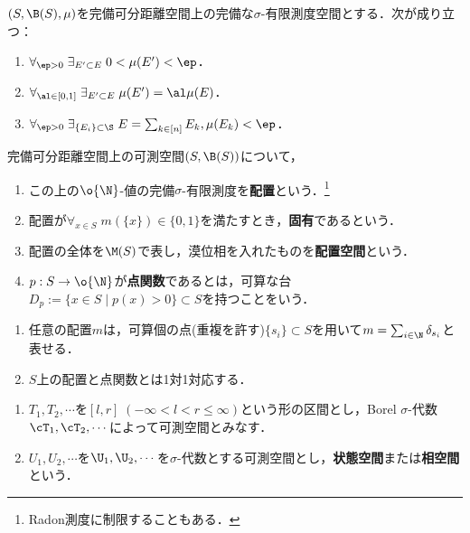 \documentclass[uplatex,dvipdfmx]{jsreport}
\begin{document}
\begin{lemma}
    $(S,\B(S),\mu)$を完備可分距離空間上の完備な$\sigma$-有限測度空間とする．次が成り立つ：
    \begin{enumerate}
        \item $\forall_{\ep>0}\;\exists_{E'\subset E}\;0<\mu(E')<\ep$．
        \item $\forall_{\al\in[0,1]}\;\exists_{E'\subset E}\;\mu(E')=\al\mu(E)$．
        \item $\forall_{\ep>0}\;\exists_{\{E_i\}\subset\S}\;E=\sum_{k\in[n]}E_k,\mu(E_k)<\ep$．
    \end{enumerate}
\end{lemma}

\begin{definition}
    完備可分距離空間上の可測空間$(S,\B(S))$について，
    \begin{enumerate}
        \item この上の$\o{\N}$-値の完備$\sigma$-有限測度を\textbf{配置}という．\footnote{Radon測度に制限することもある．}
        \item 配置が$\forall_{x\in S}\;m(\{x\})\in\{0,1\}$を満たすとき，\textbf{固有}であるという．
        \item 配置の全体を$\M(S)$で表し，漠位相を入れたものを\textbf{配置空間}という．
        \item $p:S\to\o{\N}$が\textbf{点関数}であるとは，可算な台$D_p:=\{x\in S\mid p(x)>0\}\subset S$を持つことをいう．
    \end{enumerate}
\end{definition}

\begin{lemma}\mbox{}
    \begin{enumerate}
        \item 任意の配置$m$は，可算個の点(重複を許す)$\{s_i\}\subset S$を用いて$m=\sum_{i\in\N}\delta_{s_i}$と表せる．
        \item $S$上の配置と点関数とは1対1対応する．
    \end{enumerate}
\end{lemma}

\begin{notation}\mbox{}
    \begin{enumerate}
        \item $T_1,T_2,\cdots$を$[l,r]\;(-\infty<l<r\le\infty)$という形の区間とし，Borel $\sigma$-代数$\cT_1,\cT_2,\cdots$によって可測空間とみなす．
        \item $U_1,U_2,\cdots$を$\U_1,\U_2,\cdots$を$\sigma$-代数とする可測空間とし，\textbf{状態空間}または\textbf{相空間}という．
    \end{enumerate}
\end{notation}
\end{document}
